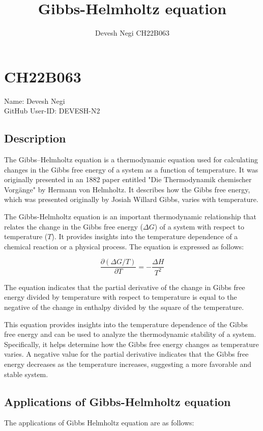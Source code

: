 \documentclass{article}
\author{Devesh Negi CH22B063}
\title{	Gibbs-Helmholtz equation}
\begin{document}
\maketitle

\section{CH22B063}

Name: Devesh Negi \\
GitHub User-ID: DEVESH-N2 

\subsection{Description}

The Gibbs–Helmholtz equation is a thermodynamic equation used for calculating changes in the Gibbs free energy of a system as a function of temperature. It was originally presented in an 1882 paper entitled "Die Thermodynamik chemischer Vorgänge" by Hermann von Helmholtz. It describes how the Gibbs free energy, which was presented originally by Josiah Willard Gibbs, varies with temperature.


The Gibbs-Helmholtz equation is an important thermodynamic relationship that relates the change in the Gibbs free energy ($\Delta G$) of a system with respect to temperature ($T$). It provides insights into the temperature dependence of a chemical reaction or a physical process. The equation is expressed as follows:

\[
\frac{\partial(\Delta G/T)}{\partial T} = -\frac{\Delta H}{T^2}
\]

The equation indicates that the partial derivative of the change in Gibbs free energy divided by temperature with respect to temperature is equal to the negative of the change in enthalpy divided by the square of the temperature.


This equation provides insights into the temperature dependence of the Gibbs free energy and can be used to analyze the thermodynamic stability of a system. Specifically, it helps determine how the Gibbs free energy changes as temperature varies. A negative value for the partial derivative indicates that the Gibbs free energy decreases as the temperature increases, suggesting a more favorable and stable system.


\subsection{Applications of Gibbs-Helmholtz equation}
The applications of Gibbs Helmholtz equation are as follows:
\end{document}
